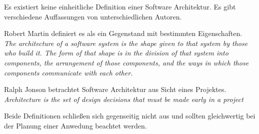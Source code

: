 Es existiert keine einheitliche Definition einer Software Architektur. 
Es gibt verschiedene Auffassungen von unterschiedlichen Autoren.

Robert Martin definiert es als ein Gegenstand mit bestimmten Eigenschaften.\\
\textit{The architecture of a software system is the shape given to that system by those who build it. 
The form of that shape is in the division of that system into components, the arrangement of those components, 
and the ways in which those components communicate with each other.} \cite[136]{cleanArchitecture}

Ralph Jonson betrachtet Software Architektur aus Sicht eines Projektes.\\
\textit{Architecture is the set of design decisions that must be made early in a project}
\cite{MF_WhatIsSA}

Beide Definitionen schließen sich gegenseitig nicht aus und
sollten gleichwertig bei der Planung einer Anwedung beachtet werden.